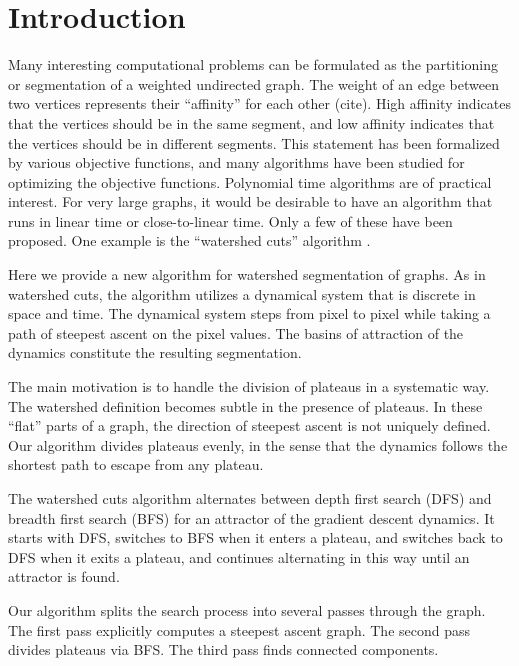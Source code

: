 \documentclass{article}
\begin{document}

\section{Introduction}
Many interesting computational problems can be formulated as the
partitioning or segmentation of a weighted undirected graph.  The
weight of an edge between two vertices represents their ``affinity'' for each other (cite).  High affinity indicates that the vertices should be in
the same segment, and low affinity indicates that the vertices should
be in different segments.  This statement has been formalized by
various objective functions, and many algorithms have been studied for
optimizing the objective functions.  Polynomial time algorithms are of
practical interest.  For very large graphs, it would be desirable to
have an algorithm that runs in linear time or close-to-linear time.
Only a few of these have been proposed.  One example is the
``watershed cuts'' algorithm \cite{Cousty2009,Cousty2010}.

Here we provide a new algorithm for watershed segmentation of graphs.
As in watershed cuts, the algorithm utilizes a dynamical system that
is discrete in space and time.  The dynamical system steps from pixel
to pixel while taking a path of steepest ascent on the pixel values.
The basins of attraction of the dynamics constitute the resulting
segmentation.

The main motivation is to handle the division of plateaus in a
systematic way. The watershed definition becomes subtle in the
presence of plateaus.  In these ``flat'' parts of a graph, the
direction of steepest ascent is not uniquely defined.  Our algorithm
divides plateaus evenly, in the sense that the dynamics follows the
shortest path to escape from any plateau.

The watershed cuts algorithm alternates between depth first search
(DFS) and breadth first search (BFS) for an attractor of the gradient
descent dynamics.  It starts with DFS, switches to BFS when it enters
a plateau, and switches back to DFS when it exits a plateau, and
continues alternating in this way until an attractor is found.

Our algorithm splits the search process into several passes through
the graph.  The first pass explicitly computes a steepest ascent
graph.  The second pass divides plateaus via BFS. The third pass finds
connected components.
\end{document}
